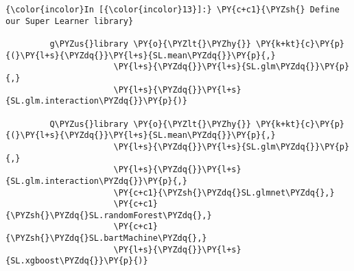 
    \begin{Verbatim}[commandchars=\\\{\}]
{\color{incolor}In [{\color{incolor}13}]:} \PY{c+c1}{\PYZsh{} Define our Super Learner library}
         
         g\PYZus{}library \PY{o}{\PYZlt{}\PYZhy{}} \PY{k+kt}{c}\PY{p}{(}\PY{l+s}{\PYZdq{}}\PY{l+s}{SL.mean\PYZdq{}}\PY{p}{,}
                      \PY{l+s}{\PYZdq{}}\PY{l+s}{SL.glm\PYZdq{}}\PY{p}{,}
                      \PY{l+s}{\PYZdq{}}\PY{l+s}{SL.glm.interaction\PYZdq{}}\PY{p}{)}
         
         Q\PYZus{}library \PY{o}{\PYZlt{}\PYZhy{}} \PY{k+kt}{c}\PY{p}{(}\PY{l+s}{\PYZdq{}}\PY{l+s}{SL.mean\PYZdq{}}\PY{p}{,}
                      \PY{l+s}{\PYZdq{}}\PY{l+s}{SL.glm\PYZdq{}}\PY{p}{,}
                      \PY{l+s}{\PYZdq{}}\PY{l+s}{SL.glm.interaction\PYZdq{}}\PY{p}{,}
                      \PY{c+c1}{\PYZsh{}\PYZdq{}SL.glmnet\PYZdq{},}
                      \PY{c+c1}{\PYZsh{}\PYZdq{}SL.randomForest\PYZdq{},}
                      \PY{c+c1}{\PYZsh{}\PYZdq{}SL.bartMachine\PYZdq{},}
                      \PY{l+s}{\PYZdq{}}\PY{l+s}{SL.xgboost\PYZdq{}}\PY{p}{)}
\end{Verbatim}


